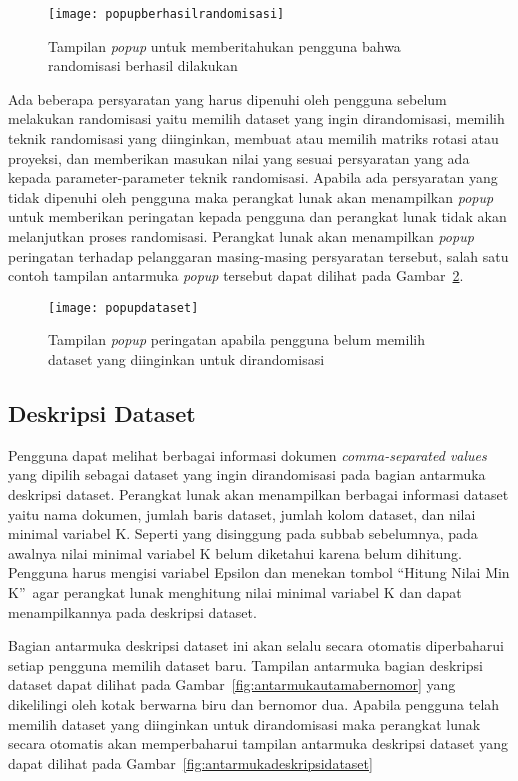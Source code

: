 \begin{figure}
	\centering
	\texttt{[image: popupberhasilrandomisasi]}
	\caption{Tampilan \textit{popup} untuk memberitahukan pengguna bahwa randomisasi berhasil dilakukan}
	\label{fig:popupberhasilrandomisasi}
\end{figure}

Ada beberapa persyaratan yang harus dipenuhi oleh pengguna sebelum melakukan randomisasi yaitu memilih dataset yang ingin dirandomisasi, memilih teknik randomisasi yang diinginkan, membuat atau memilih matriks rotasi atau proyeksi, dan memberikan masukan nilai yang sesuai persyaratan yang ada kepada parameter-parameter teknik randomisasi. Apabila ada persyaratan yang tidak dipenuhi oleh pengguna maka perangkat lunak akan menampilkan \textit{popup} untuk memberikan peringatan kepada pengguna dan perangkat lunak tidak akan melanjutkan proses randomisasi. Perangkat lunak akan menampilkan \textit{popup} peringatan terhadap pelanggaran masing-masing persyaratan tersebut, salah satu contoh tampilan antarmuka \textit{popup} tersebut dapat dilihat pada Gambar~\ref{fig:popupdataset}.

\begin{figure}
	\centering
	\texttt{[image: popupdataset]}
	\caption{Tampilan \textit{popup} peringatan apabila pengguna belum memilih dataset yang diinginkan untuk dirandomisasi}
	\label{fig:popupdataset}
\end{figure}

\subsection{Deskripsi Dataset}
\label{sec:deskripsidataset}

Pengguna dapat melihat berbagai informasi dokumen \textit{comma-separated values} yang dipilih sebagai dataset yang ingin dirandomisasi pada bagian antarmuka deskripsi dataset. Perangkat lunak akan menampilkan berbagai informasi dataset yaitu nama dokumen, jumlah baris dataset, jumlah kolom dataset, dan nilai minimal variabel K. Seperti yang disinggung pada subbab sebelumnya, pada awalnya nilai minimal variabel K belum diketahui karena belum dihitung. Pengguna harus mengisi variabel Epsilon dan menekan tombol \textquotedblleft Hitung Nilai Min K\textquotedblright~agar perangkat lunak menghitung nilai minimal variabel K dan dapat menampilkannya pada deskripsi dataset.

Bagian antarmuka deskripsi dataset ini akan selalu secara otomatis diperbaharui setiap pengguna memilih dataset baru. Tampilan antarmuka bagian deskripsi dataset dapat dilihat pada Gambar~\ref{fig:antarmukautamabernomor} yang dikelilingi oleh kotak berwarna biru dan bernomor dua. Apabila pengguna telah memilih dataset yang diinginkan untuk dirandomisasi maka perangkat lunak secara otomatis akan memperbaharui tampilan antarmuka deskripsi dataset yang dapat dilihat pada Gambar~\ref{fig:antarmukadeskripsidataset}

